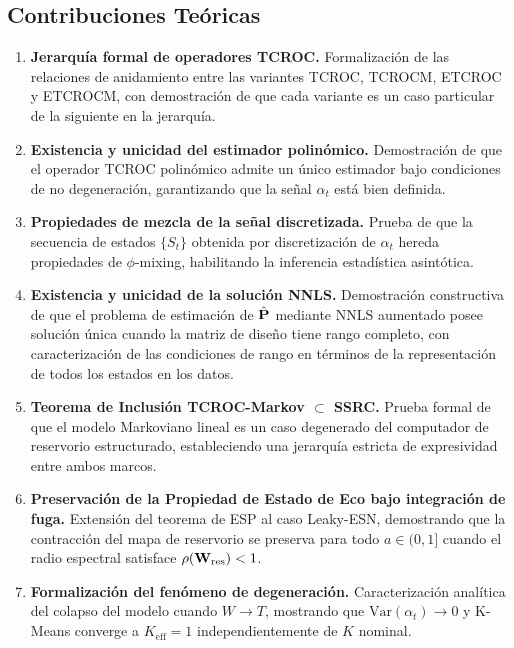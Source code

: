 \subsection{Contribuciones Teóricas}

\begin{enumerate}
    \item \textbf{Jerarquía formal de operadores TCROC.}
    Formalización de las relaciones de anidamiento entre las
    variantes TCROC, TCROCM, ETCROC y ETCROCM, con demostración de
    que cada variante es un caso particular de la siguiente en la
    jerarquía.

    \item \textbf{Existencia y unicidad del estimador polinómico.}
    Demostración de que el operador TCROC polinómico admite un
    único estimador bajo condiciones de no degeneración, garantizando
    que la señal $\alpha_t$ está bien definida.

    \item \textbf{Propiedades de mezcla de la señal discretizada.}
    Prueba de que la secuencia de estados $\{S_t\}$ obtenida por
    discretización de $\alpha_t$ hereda propiedades de $\phi$-mixing,
    habilitando la inferencia estadística asintótica.

    \item \textbf{Existencia y unicidad de la solución NNLS.}
    Demostración constructiva de que el problema de estimación de
    $\hat{\mathbf{P}}$ mediante NNLS aumentado posee solución única
    cuando la matriz de diseño tiene rango completo, con
    caracterización de las condiciones de rango en términos de la
    representación de todos los estados en los datos.

    \item \textbf{Teorema de Inclusión TCROC-Markov $\subset$ SSRC.}
    Prueba formal de que el modelo Markoviano lineal es un caso
    degenerado del computador de reservorio estructurado,
    estableciendo una jerarquía estricta de expresividad entre ambos
    marcos.

    \item \textbf{Preservación de la Propiedad de Estado de Eco bajo
    integración de fuga.}  Extensión del teorema de ESP al caso
    Leaky-ESN, demostrando que la contracción del mapa de reservorio
    se preserva para todo $a \in (0, 1]$ cuando el radio espectral
    satisface $\rho(\mathbf{W}_{\text{res}}) < 1$.

    \item \textbf{Formalización del fenómeno de degeneración.}
    Caracterización analítica del colapso del modelo cuando $W \to T$,
    mostrando que $\text{Var}(\alpha_t) \to 0$ y K-Means converge a
    $K_{\text{eff}} = 1$ independientemente de $K$ nominal.
\end{enumerate}

